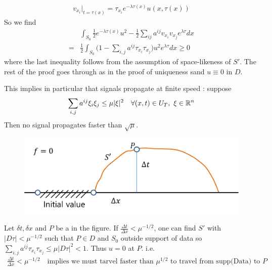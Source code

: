 \documentclass[12pt,a4paper]{report}
\newenvironment{proof}
{\begin{changemargin}{1cm}{0.5cm} 
	}%
	{\end{changemargin}
}
\begin{document}
\begin{proof}
\begin{align*}
v_{x_i} \big|_{t= \tau(x)} = \tau_{x_i} e^{-\lambda \tau(x)} u(x, \tau(x))
\end{align*}
So we find
\begin{align*}
&\int_{S_0} \frac{1}{2} e^{-\lambda \tau(x)} u^2 - \frac{1}{2} \sum_{ij} a^{ij} v_{x_i}v_{x_j} e^{\lambda \tau} dx \\
=& \frac{1}{2} \int_{S_0} \big( 1- \sum_{i,j}a^{ij}\tau_{x_i} \tau_{x_j} \big) u^2 e^{\lambda \tau} dx \geq 0
\end{align*}
where the last inequality follows from the assumption of space-likeness of $S'$. The rest of the proof goes through as in the proof of uniqueness sand $u \equiv 0$ in $D$.

\eop
\end{proof}
\s

This implies in particular that signals propagate at finite speed : suppose
\begin{align*}
\sum_{i,j} a^{ij} \xi_i \xi_j \leq \mu |\xi|^2 \quad \forall (x,t) \in U_T, \,\, \xi \in \mathbb{R}^n
\end{align*}
Then no signal propagates faster than $\sqrt{\mu}$. 
\begin{figure}[h]
\begin{center}
	\includegraphics[scale=0.6]{11}
\end{center}
\end{figure}
Let $\delta t, \delta x$ and $P$ be a in the figure. If $\frac{\Delta t}{\Delta x} < \mu^{-1/2}$, one can find $S'$ with $|D\tau |< \mu^{-1/2}$ such that $P\in D$ and $S_0$ outside support of data so $\sum_{i,j} a^{ij} \tau_{x_i} \tau_{x_j} \leq \mu |D\tau|^2 <1$. Thus $u=0$ at $P$. i.e.
\begin{align*}
\frac{\Delta t}{\Delta x} < \mu^{-1/2} \quad \text{implies we must tarvel faster than } \mu^{1/2} \text{ to travel from supp(Data) to } P
\end{align*}
\s
\end{document}
